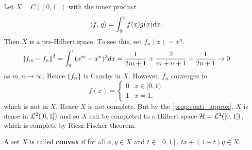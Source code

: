 \begin{example}
    Let $X = C([0,1])$ with the inner product 
    \begin{equation*}
        \left\langle {f},\, {g} \right\rangle = \int_0^1 f(x)g(x)dx.
    \end{equation*}
    Then $X$ is a pre-Hilbert space. To see this, set $f_n(x) = x^n$. 
    \begin{equation*}
        \left\lVert {f_m-f_n} \right\rVert^2 = \int_0^1 (x^m - x^n)^2dx 
        = \frac{1}{2m+1} + \frac{2}{m+n+1} + \frac{1}{2n+1}\to 0
    \end{equation*}
    as $m,n\to\infty$. Hence $\left\{ {f_n} \right\}$ is Cauchy in $X$. However, $f_n$ 
    converges to 
    \begin{equation*}
        f(x) = \begin{cases}
            0 & x\in[0,1) \\
            1 & x = 1,
        \end{cases}
    \end{equation*}
    which is not in $X$. Hence $X$ is not complete. But by the 
    \cref{prop:conti_approx}, $X$ is dense in $\mathcal{L}^2([0,1])$ and so $X$ can be 
    completed to a Hilbert space $\mathcal{H} = \mathcal{L}^2([0,1])$, which is complete by 
    Riesz-Fischer theorem.
\end{example}

\begin{definition}
    A set $X$ is called \textbf{convex} if for all $x,y\in X$ and $t\in[0,1]$, 
    $tx + (1-t)y\in X$.
\end{definition}


